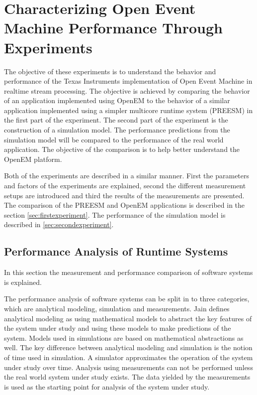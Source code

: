 \chapter [OpenEM Experiments] {Characterizing Open Event Machine Performance
Through Experiments}
\label{chapter:experiments}
The objective of these experiments is to understand the behavior and
performance of the Texas Instruments implementation of Open Event Machine in
realtime stream processing. The objective is achieved by comparing the behavior
of an application implemented using OpenEM to the behavior of a similar
application implemented using a simpler multicore runtime system (PREESM) in the
first part of the experiment. The second part of the experiment is the
construction of a simulation model. The performance predictions from the
simulation model will be compared to the performance of the real world
application. The objective of the comparison is to help better understand the
OpenEM platform.

Both of the experiments are described in a similar manner. First the parameters
and factors of the experiments are explained, second the different measurement
setups are introduced and third the results of the measurements are presented.
The comparison of the PREESM and OpenEM applications is described in the section
\ref{sec:firstexperiment}. The performance of the simulation model is described
in \ref{sec:secondexperiment}.

\section{Performance Analysis of Runtime Systems}
\label{sec:perfanalysis}
In this section the measurement and performance comparison of software systems
is explained.

The performance analysis of software systems can be split in to three
categories, which are analytical modeling, simulation and measurements. Jain
defines analytical modeling as using mathematical models to abstract the key
features of the system under study and using these models to make predictions of
the system. Models used in simulations are based on mathematical abstractions as
well. The key difference between analytical modeling and simulation is the
notion of time used in simulation. A simulator approximates the operation of the
system under study over time. Analysis using measurements can not be performed
unless the real world system under study exists. The data yielded by the
measurements is used as the starting point for analysis of the system under
study. \cite{jain1991art}

